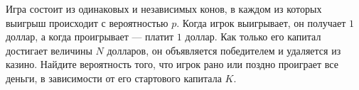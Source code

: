 \documentclass{article}
\begin{document}
Игра состоит из одинаковых и независимых конов, в каждом из которых выигрыш происходит с вероятностью $p$. Когда игрок выигрывает, 
он получает $1$ доллар, а когда проигрывает --- платит $1$ доллар. Как только его капитал достигает величины $N$ долларов, он объявляется победителем и удаляется из казино. 
Найдите вероятность того, что игрок рано или поздно проиграет все деньги, в зависимости от его стартового капитала $K$.
\end{document}
